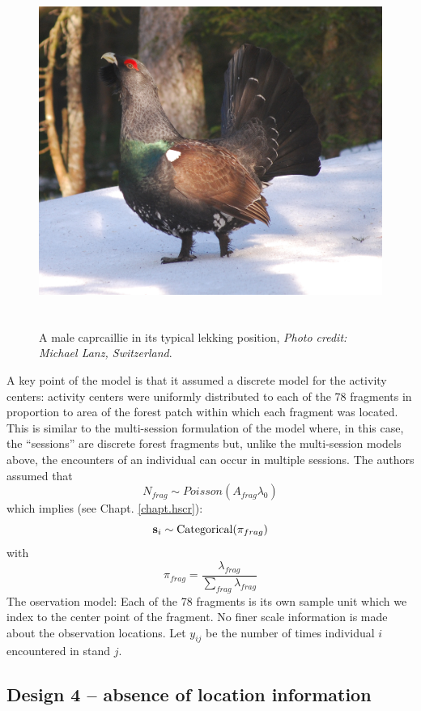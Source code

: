 \begin{figure}
\centering
\includegraphics[width=5in,height=4.21in]{Ch15-searchencounter/figs/capercaillie_lanz.jpg}
\label{searchencounter.fig.capercaillie}
\caption{A male caprcaillie in its typical lekking position,
{\it Photo credit: Michael Lanz, Switzerland}.
}
\end{figure}

A key point of the model is that it assumed a discrete model for the
activity centers: activity centers were uniformly distributed to each
of the 78 fragments in proportion to area of the forest patch within
which each fragment was located.  This is similar to the multi-session
formulation of the model where, in this case, the ``sessions'' are
discrete forest fragments but, unlike the multi-session models above,
the encounters of an individual can occur in multiple sessions.  The
authors assumed that
\[
 N_{frag} \sim Poisson( A_{frag} \lambda_{0} )
\]
which implies (see Chapt. \ref{chapt.hscr}):
\[
{\bf s}_{i} \sim  \mbox{Categorical}(  \pi_{frag} )
\]
with
\[
 \pi_{frag} = \frac{ \lambda_{frag} }{\sum_{frag} \lambda_{frag}}
\]
The oservation model: Each of the 78 fragments is its own sample unit which we index to the
center point of the fragment. No finer scale information is made about
the observation locations.
Let $y_{ij}$ be  the number of times individual $i$ encountered in stand $j$.

\subsection{Design 4 -- absence of location information}

